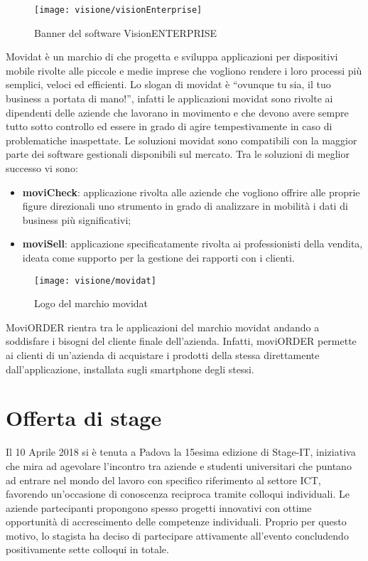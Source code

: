 \begin{figure}[!h] 
    \centering 
    \texttt{[image: visione/visionEnterprise]} 
    \caption{Banner del software VisionENTERPRISE}
\end{figure}

Movidat è un marchio di \visione{} che progetta e sviluppa applicazioni per dispositivi mobile rivolte alle piccole e medie imprese che vogliono rendere i loro processi più semplici, veloci ed efficienti. Lo slogan di movidat è ``ovunque tu sia, il tuo business a portata di mano!'', infatti le applicazioni movidat sono rivolte ai dipendenti delle aziende che lavorano in movimento e che devono avere sempre tutto sotto controllo ed essere in grado di agire tempestivamente in caso di problematiche inaspettate. Le soluzioni movidat sono compatibili con la maggior parte dei software gestionali disponibili sul mercato. Tra le soluzioni di meglior successo vi sono:
\begin{itemize}
	\item \textbf{moviCheck}: applicazione rivolta alle aziende che vogliono offrire alle proprie figure direzionali uno strumento in grado di analizzare in mobilità i dati di business più significativi;
	\item \textbf{moviSell}: applicazione specificatamente rivolta ai professionisti della vendita, ideata come supporto per la gestione dei rapporti con i clienti.
\end{itemize}

\begin{figure}[!h] 
    \centering 
    \texttt{[image: visione/movidat]} 
    \caption{Logo del marchio movidat}
\end{figure}

MoviORDER rientra tra le applicazioni del marchio movidat andando a soddisfare i bisogni del cliente finale dell'azienda. Infatti, moviORDER permette ai clienti di un'azienda di acquistare i prodotti della stessa direttamente dall'applicazione, installata sugli smartphone degli stessi.

\section{Offerta di stage}

Il 10 Aprile 2018 si è tenuta a Padova la 15esima edizione di Stage-IT, iniziativa che mira ad agevolare l'incontro tra aziende e studenti universitari che puntano ad entrare nel mondo del lavoro con specifico riferimento al settore ICT, favorendo un'occasione di conoscenza reciproca tramite colloqui individuali. Le aziende partecipanti propongono spesso progetti innovativi con ottime opportunità di accrescimento delle competenze individuali. Proprio per questo motivo, lo stagista ha deciso di partecipare attivamente all'evento concludendo positivamente sette colloqui in totale. 

